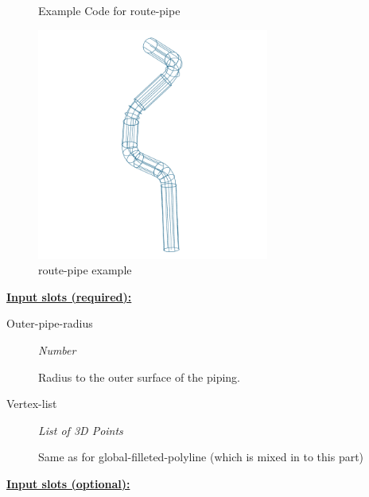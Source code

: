 \documentclass [11pt]{book}
\begin{document}
\begin{itemize}
\begin{figure}
\caption{Example Code for route-pipe}

\label{fig:example-code-route-pipe}

\end{figure}

\begin{figure}
\begin{center}
\includegraphics[width=3in,height=3in]{../images/example-route-pipe.pdf}
\end{center}

\caption{route-pipe example}

\label{fig:route-pipe}

\end{figure}





\textbf{
\underline{Input slots (required):}}

\begin{description}

\item [Outer-pipe-radius]
\emph{Number}

 Radius to the outer surface of the piping.




\item [Vertex-list]
\emph{List of 3D Points}

 Same as for global-filleted-polyline (which is mixed in to this part)




\end{description}






\textbf{
\underline{Input slots (optional):}}


\end{itemize}
\end{document}
